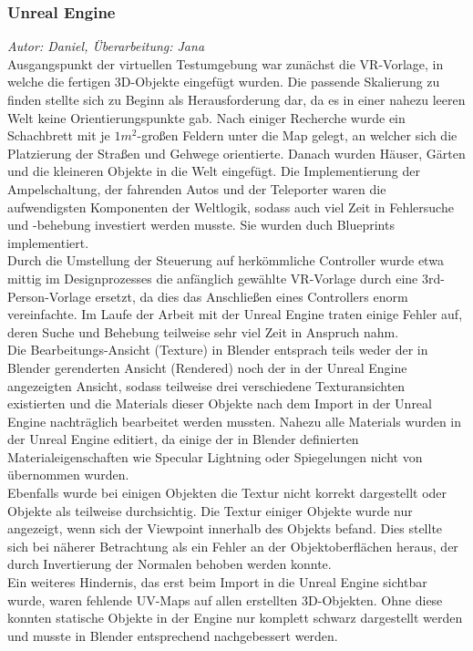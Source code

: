 \documentclass{Bericht}
\begin{document}
\subsubsection{Unreal Engine}
\textit{Autor: Daniel, Überarbeitung: Jana}\\
Ausgangspunkt der virtuellen Testumgebung war zunächst die VR-Vorlage, in welche die fertigen 3D-Objekte eingefügt wurden. Die passende Skalierung zu finden stellte sich zu Beginn als Herausforderung dar, da es in einer nahezu leeren Welt keine Orientierungspunkte gab. Nach einiger Recherche wurde ein Schachbrett mit je $1m^{2}$-großen Feldern unter die Map gelegt, an welcher sich die Platzierung der Straßen und Gehwege orientierte. Danach wurden Häuser, Gärten und die kleineren Objekte in die Welt eingefügt.
Die Implementierung der Ampelschaltung, der fahrenden Autos und der Teleporter waren die aufwendigsten Komponenten der Weltlogik, sodass auch viel Zeit in Fehlersuche und -behebung investiert werden musste. Sie wurden duch Blueprints implementiert.\\
		Durch die Umstellung der Steuerung auf herkömmliche Controller wurde etwa mittig im Designprozesses die anfänglich gewählte VR-Vorlage durch eine 3rd-Person-Vorlage ersetzt, da dies das Anschließen eines Controllers enorm vereinfachte.
		Im Laufe der Arbeit mit der Unreal Engine traten einige Fehler auf, deren Suche und Behebung teilweise sehr viel Zeit in Anspruch nahm.\\
Die Bearbeitungs-Ansicht (Texture) in Blender entsprach teils weder der in Blender gerenderten Ansicht (Rendered) noch der in der Unreal Engine angezeigten Ansicht, sodass teilweise drei verschiedene Texturansichten existierten und die Materials dieser Objekte nach dem Import in der Unreal Engine nachträglich bearbeitet werden mussten. Nahezu alle Materials wurden in der Unreal Engine editiert, da einige der in Blender definierten Materialeigenschaften wie Specular Lightning oder Spiegelungen nicht von übernommen wurden.\\
Ebenfalls wurde bei einigen Objekten die Textur nicht korrekt dargestellt oder Objekte als teilweise durchsichtig. 
Die Textur einiger Objekte wurde nur angezeigt, wenn sich der Viewpoint innerhalb des Objekts befand. Dies stellte sich bei näherer Betrachtung als ein Fehler an der Objektoberflächen heraus, der durch Invertierung der Normalen behoben werden konnte.\\
Ein weiteres Hindernis, das erst beim Import in die Unreal Engine sichtbar wurde, waren fehlende UV-Maps auf allen erstellten 3D-Objekten. Ohne diese konnten statische Objekte in der Engine nur komplett schwarz dargestellt werden und musste in Blender entsprechend nachgebessert werden. 
\end{document}
